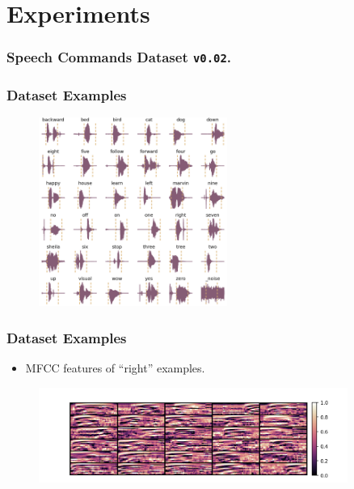 
\section{Experiments}

\begin{frame}
  \frametitle{Speech Commands Dataset \texttt{v0.02}.}
  
\end{frame}

\begin{frame}
  \frametitle{Dataset Examples}
  \vspace{-0.75cm}
  \begin{figure}[!ht]
    \centering
      \includegraphics[width=0.55\textwidth]{../5_exp/figs/exp_dataset_speech_cmd_wav_grid.png}
  \end{figure}
\end{frame}

\begin{frame}
  \frametitle{Dataset Examples}
  \vspace{-0.75cm}
  \begin{itemize}
    \item MFCC features of \enquote{right} examples.
  \end{itemize}
  \begin{figure}[!ht]
    \centering
    \includegraphics[width=0.9\textwidth]{../5_exp/figs/exp_dataset_speech_cmd_mfcc_right.png}
  \end{figure}
\end{frame}

